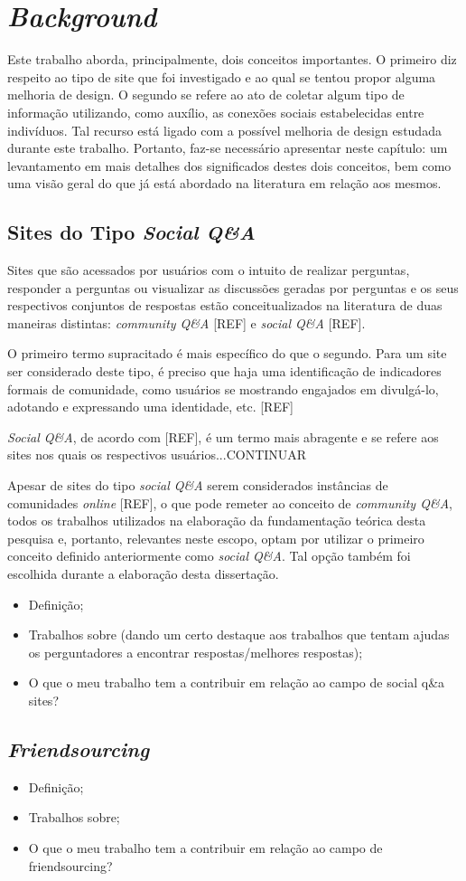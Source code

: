 \chapter{\textit{Background}}
Este trabalho aborda, principalmente, dois conceitos importantes. O primeiro diz respeito ao tipo de site que foi investigado e ao qual se tentou propor alguma melhoria de design. O segundo se refere ao ato de coletar algum tipo de informação utilizando, como auxílio, as conexões sociais estabelecidas entre indivíduos. Tal recurso está ligado com a possível melhoria de design estudada durante este trabalho. Portanto, faz-se necessário apresentar neste capítulo: um levantamento em mais detalhes dos significados destes dois conceitos, bem como uma visão geral do que já está abordado na literatura em relação aos mesmos.

\section{Sites do Tipo \textit{Social Q\&A}}
Sites que são acessados por usuários com o intuito de realizar perguntas, responder a perguntas ou visualizar as discussões geradas por perguntas e os seus respectivos conjuntos de respostas estão conceitualizados na literatura de duas maneiras distintas: \textit{community Q\&A} [REF] e \textit{social Q\&A} [REF].

O primeiro termo supracitado é mais específico do que o segundo. Para um site ser considerado deste tipo, é preciso que haja uma identificação de indicadores formais de comunidade, como usuários se mostrando engajados em divulgá-lo, adotando e expressando uma identidade, etc. [REF]

\textit{Social Q\&A}, de acordo com [REF], é um termo mais abragente e se refere aos sites nos quais os respectivos usuários...CONTINUAR

Apesar de sites do tipo \textit{social Q\&A} serem considerados instâncias de comunidades \textit{online} [REF], o que pode remeter ao conceito de \textit{community Q\&A}, todos os trabalhos utilizados na elaboração da fundamentação teórica desta pesquisa e, portanto, relevantes neste escopo, optam por utilizar o primeiro conceito definido anteriormente como \textit{social Q\&A}. Tal opção também foi escolhida durante a elaboração desta dissertação. 
\begin{itemize}
  \item Definição;
  \item Trabalhos sobre (dando um certo destaque aos trabalhos que tentam ajudas os perguntadores a encontrar respostas/melhores respostas);
  \item O que o meu trabalho tem a contribuir em relação ao campo de social q\&a sites?
\end{itemize}
\section{\textit{Friendsourcing}}
\begin{itemize}
  \item Definição;
  \item Trabalhos sobre;
  \item O que o meu trabalho tem a contribuir em relação ao campo de friendsourcing?
\end{itemize}